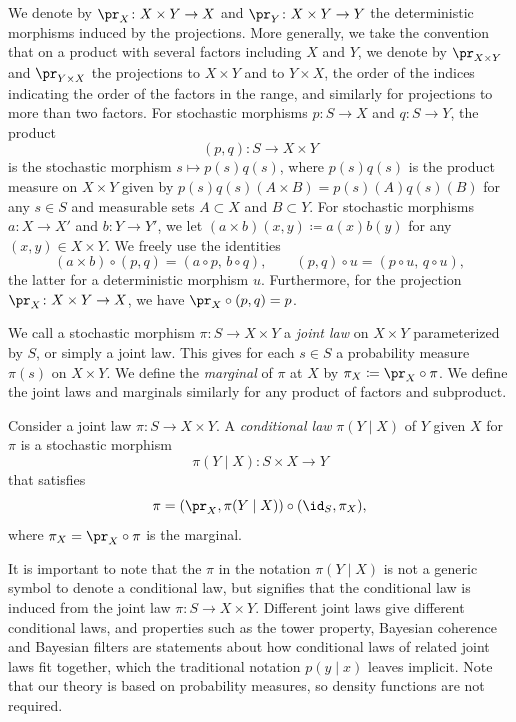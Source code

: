 \documentclass[12pt,reqno]{amsart}%
\theoremstyle{plain}
\theoremstyle{definition}
\begin{document}
We denote by $\pr_X\colon X\times Y\rightarrow X$ and
$\pr_Y\colon X\times Y\rightarrow Y$ the deterministic morphisms
induced by the projections.
More generally, we take the convention that on a product with several factors including $X$ and $Y$,
we denote by $\pr_{X\times Y}$ and $\pr_{Y\times X}$ the projections to $X\times Y$
and to $Y\times X$, the order of the indices indicating the order of the factors
in the range, and similarly for projections to more than two factors.
For stochastic morphisms $p\colon S\rightarrow X$ and $q\colon S\rightarrow Y$, the product
\[
	(p,q)\colon S\rightarrow X\times Y
\]
is the stochastic morphism $s\mapsto p(s)q(s)$,
where $p(s)q(s)$ is the product measure on $X\times Y$ given by $p(s)q(s)(A\times B)=p(s)(A)q(s)(B)$
for any $s\in S$ and measurable sets $A\subset X$ and $B\subset Y$.
For stochastic morphisms $a\colon X\rightarrow X'$ and $b\colon Y\rightarrow Y'$, 
we let $(a\times b)(x,y)\coloneqq a(x)b(y)$ for any $(x,y)\in X\times Y$.
We freely use the identities
\begin{equation}\label{eq: product}
	(a\times b)\circ(p,q)=(a\circ p,\,b\circ q),\qquad (p,q)\circ u=(p\circ u,\,q\circ u),
\end{equation}
the latter for a deterministic morphism $u$.
Furthermore, for the projection $\pr_X\colon X\times Y\rightarrow X$,
we have $\pr_X\circ(p,q)=p$.

We call a stochastic morphism $\pi\colon S\rightarrow X\times Y$ a \emph{joint law} on $X\times Y$ parameterized by $S$, or simply a joint law.
This gives for each $s\in S$ a probability measure $\pi(s)$ on $X\times Y$.
We define the \emph{marginal} of $\pi$ at $X$ by $\pi_X\coloneqq\pr_X\circ\pi$.
We define the joint laws and marginals similarly for any product of factors and subproduct.

\begin{definition}\label{def: CL}
	Consider a joint law $\pi\colon S\rightarrow X\times Y$.
	A \emph{conditional law} $\pi(Y\mid X)$ of $Y$ given $X$ for $\pi$ is a stochastic morphism
	\[
		\pi(Y\mid X)\colon S\times X\rightarrow Y
	\]
	that satisfies
	\begin{equation}\label{eq: CL}
		\pi=(\pr_X,\pi(Y\mid X))\circ(\id_S,\pi_X),
	\end{equation}
	where $\pi_X=\pr_X\circ\pi$ is the marginal.
\end{definition}

It is important to note that the $\pi$ in the notation $\pi(Y\mid X)$ is not a generic symbol to denote a
conditional law, but signifies that the conditional law is induced from the joint law
$\pi\colon S\rightarrow X\times Y$.
Different joint laws give different conditional laws, and
properties such as the tower property, Bayesian coherence and Bayesian filters are statements about
how conditional laws of related joint laws fit together, which the traditional notation
$p(y\mid x)$ leaves implicit.  Note that our theory is based on probability measures,
so density functions are not required.
\end{document}
